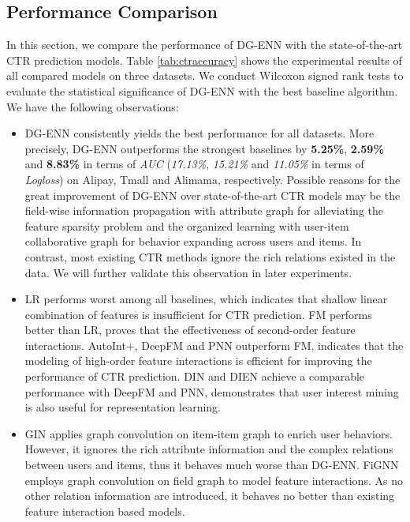 \subsection{Performance Comparison}\label{PerformanceComparison}
In this section, we compare the performance of DG-ENN with the state-of-the-art CTR prediction models.
Table \ref{tab:ctraccuracy} shows the experimental results of all compared models on three datasets.
We conduct Wilcoxon signed rank tests \cite{significant-test} to evaluate the statistical significance of DG-ENN with the best baseline algorithm. 
We have the following observations:
\begin{itemize}
    \item DG-ENN consistently yields the best performance for all datasets. 
    More precisely, DG-ENN outperforms the strongest baselines by \textbf{5.25\%}, \textbf{2.59\%} and \textbf{8.83\%} in terms of \textit{AUC} (\textit{17.13\%}, \textit{15.21\%} and \textit{11.05\%} in terms of \textit{Logloss}) on Alipay, Tmall and Alimama, respectively. 
    Possible reasons for the great improvement of DG-ENN over state-of-the-art CTR models may be the field-wise information propagation with attribute graph for alleviating the feature sparsity problem and the organized learning with user-item collaborative graph for behavior expanding across users and items.
    In contrast, most existing CTR methods ignore the rich relations existed in the data.
    We will further validate this observation in later experiments.
    \item LR performs worst among all baselines, which indicates that shallow linear combination of features is insufficient for CTR prediction. 
    FM performs better than LR, proves that the effectiveness of second-order feature interactions. 
    AutoInt+, DeepFM and PNN outperform FM, indicates that the modeling of high-order feature interactions is efficient for improving the performance of CTR prediction.
    DIN and DIEN achieve a comparable performance with DeepFM and PNN, demonstrates that user interest mining is also useful for representation learning. 
    \item GIN applies graph convolution on item-item graph to enrich user behaviors.
    However, it ignores the rich attribute information and the complex relations between users and items, thus it behaves much worse than DG-ENN.
    FiGNN employs graph convolution on field graph to model feature interactions.
    As no other relation information are introduced, it behaves no better than existing feature interaction based models. 
\end{itemize}

